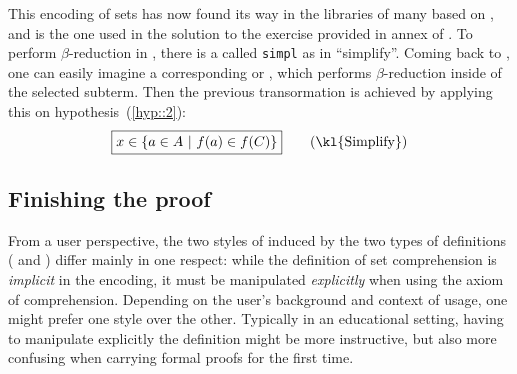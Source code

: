 \AP This encoding of sets has now found its way in the libraries of many
 based on , and is the one used in the
 solution to the exercise provided in annex of
\cite{bartzia:hal-04087080}. To perform $\beta$-reduction in , there is
a  called \texttt{simpl} as in ``simplify''. Coming back to , one can
easily imagine a corresponding  or 
, which performs $\beta$-reduction inside of the selected
subterm. Then the previous transormation is achieved by applying this  on
hypothesis~(\ref{hyp::2}):
$$\select{x \in \compr{a \in A}{f(a) \in f(C)}} \qquad \text{(\kl{Simplify})}$$

\subsection{Finishing the proof}

From a user perspective, the two styles of  induced by the two types of
definitions ( and ) differ mainly in one
respect: while the definition of set comprehension is \emph{implicit} in the
 encoding, it must be manipulated \emph{explicitly} when
using the axiom of comprehension. Depending on the user's background and context of usage, one might
prefer one style over the other. Typically in an educational setting, having to
manipulate explicitly the  definition might be more instructive,
but also more confusing when carrying formal proofs for the first time.

